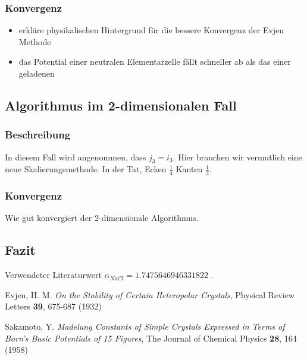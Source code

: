 \documentclass[10pt,a4paper]{article}
\begin{document}
\subsubsection{Konvergenz}

\begin{itemize}
\item erkläre physikalischen Hintergrund für die bessere Konvergenz der Evjen Methode
\item das Potential einer neutralen Elementarzelle fällt schneller ab als das einer geladenen
\end{itemize}

\subsection{Algorithmus im 2-dimensionalen Fall}
\subsubsection{Beschreibung}

In diesem Fall wird angenommen, dass $j_3 = i_3$.
Hier brauchen wir vermutlich eine neue Skalierungsmethode. In der Tat, Ecken $\frac{1}{4}$ Kanten $\frac{1}{2}$.

\subsubsection{Konvergenz}

Wie gut konvergiert der 2-dimensionale Algorithmus.

\subsection{Fazit}

Verwendeter Literaturwert $\alpha_{NaCl} = 1.7475646946331822$ \cite{Sakamoto} .


\begin{thebibliography}{9}

Evjen, H. M.
\emph{On the Stability of Certain Heteropolar Crystals},
Physical Review Letters \textbf{39},
675-687 (1932)

Sakamoto, Y.
\emph{Madelung Constants of Simple Crystals Expressed in Terms of Born's Basic Potentials of 15 Figures},
The Journal of Chemical Physics \textbf{28},
164 (1958)

\end{thebibliography}
\end{document}
